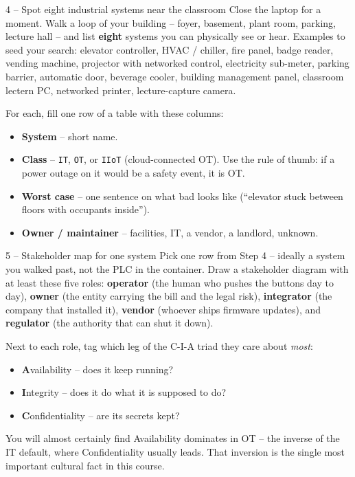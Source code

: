 \documentclass[11pt,a4paper]{article}
\begin{document}
\begin{stepbox}{4 -- Spot eight industrial systems near the classroom}
Close the laptop for a moment. Walk a loop of your building -- foyer,
basement, plant room, parking, lecture hall -- and list \textbf{eight}
systems you can physically see or hear. Examples to seed your search:
elevator controller, HVAC / chiller, fire panel, badge reader, vending
machine, projector with networked control, electricity sub-meter,
parking barrier, automatic door, beverage cooler, building management
panel, classroom lectern PC, networked printer, lecture-capture
camera.

For each, fill one row of a table with these columns:

\begin{itemize}\setlength{\itemsep}{1pt}
  \item \textbf{System} -- short name.
  \item \textbf{Class} -- \texttt{IT}, \texttt{OT}, or \texttt{IIoT}
        (cloud-connected OT). Use the rule of thumb: if a power
        outage on it would be a safety event, it is OT.
  \item \textbf{Worst case} -- one sentence on what bad looks like
        (``elevator stuck between floors with occupants inside'').
  \item \textbf{Owner / maintainer} -- facilities, IT, a vendor, a
        landlord, unknown.
\end{itemize}
\end{stepbox}

\begin{stepbox}{5 -- Stakeholder map for one system}
Pick one row from Step 4 -- ideally a system you walked past, not the
PLC in the container. Draw a stakeholder diagram with at least these
five roles: \textbf{operator} (the human who pushes the buttons day to
day), \textbf{owner} (the entity carrying the bill and the legal
risk), \textbf{integrator} (the company that installed it),
\textbf{vendor} (whoever ships firmware updates), and
\textbf{regulator} (the authority that can shut it down).

Next to each role, tag which leg of the C-I-A triad they care about
\emph{most}:

\begin{itemize}\setlength{\itemsep}{1pt}
  \item \textbf{A}vailability -- does it keep running?
  \item \textbf{I}ntegrity -- does it do what it is supposed to do?
  \item \textbf{C}onfidentiality -- are its secrets kept?
\end{itemize}

You will almost certainly find Availability dominates in OT -- the
inverse of the IT default, where Confidentiality usually leads.
That inversion is the single most important cultural fact in this
course.
\end{stepbox}
\end{document}
